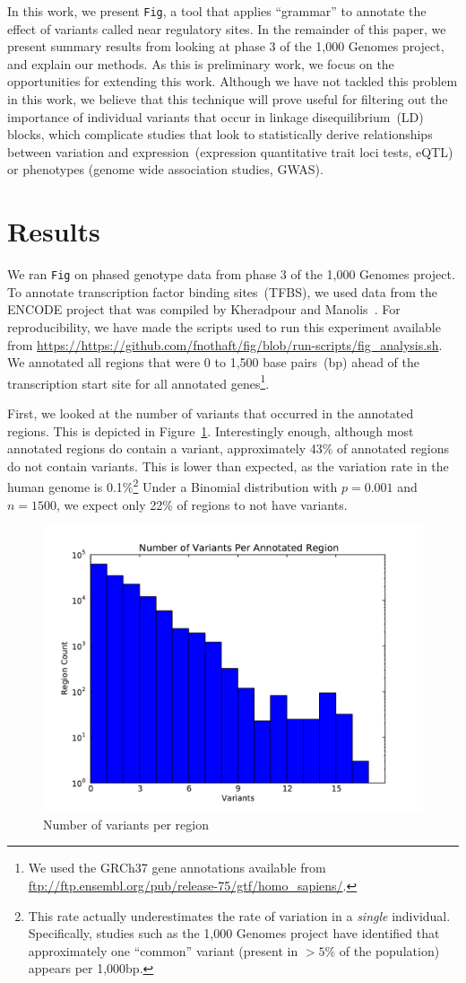 \documentclass[11pt]{article}
\theoremstyle{plain}
\begin{document}
In this work, we present \texttt{Fig}, a tool that applies ``grammar'' to annotate
the effect of variants called near regulatory sites. In the remainder of this paper,
we present summary results from looking at phase 3 of the 1,000 Genomes project,
and explain our methods. As this is preliminary work, we focus on the opportunities for
extending this work. Although we have not tackled this problem in this work, we believe
that this technique will prove useful for filtering out the importance of individual
variants that occur in linkage disequilibrium~(LD) blocks, which complicate studies that
look to statistically derive relationships between variation and expression~(expression
quantitative trait loci tests, eQTL) or phenotypes (genome wide association studies, GWAS).

\section{Results}
\label{sec:results}

We ran \texttt{Fig} on phased genotype data from phase 3 of the 1,000 Genomes project.
To annotate transcription factor binding sites~(TFBS), we used data from the ENCODE
project that was compiled by Kheradpour and Manolis~\cite{kheradpour14}. For reproducibility,
we have made the scripts used to run this experiment available from
\url{https://https://github.com/fnothaft/fig/blob/run-scripts/fig_analysis.sh}. We
annotated all regions that were 0 to 1,500 base pairs~(bp) ahead of the transcription
start site for all annotated genes\footnote{We used the GRCh37 gene annotations
available from \url{ftp://ftp.ensembl.org/pub/release-75/gtf/homo_sapiens/}.}.

First, we looked at the number of variants that occurred in the annotated regions.
This is depicted in Figure~\ref{fig:variants}. Interestingly enough, although most
annotated regions do contain a variant, approximately 43\% of annotated regions
do not contain variants. This is lower than expected, as the variation rate
in the human genome is 0.1\%\footnote{This rate actually underestimates the rate of
variation in a \emph{single} individual. Specifically, studies such as the 1,000
Genomes project have identified that approximately one ``common'' variant (present
in $>5$\% of the population) appears per 1,000bp.} Under a Binomial distribution with
$p = 0.001$ and $n = 1500$, we expect only 22\% of regions to not have variants.

\begin{figure}[h]
\begin{center}
\includegraphics[width=0.25\linewidth]{graphs/variants.pdf}
\end{center}
\caption{Number of variants per region}
\label{fig:variants}
\end{figure}
\end{document}
